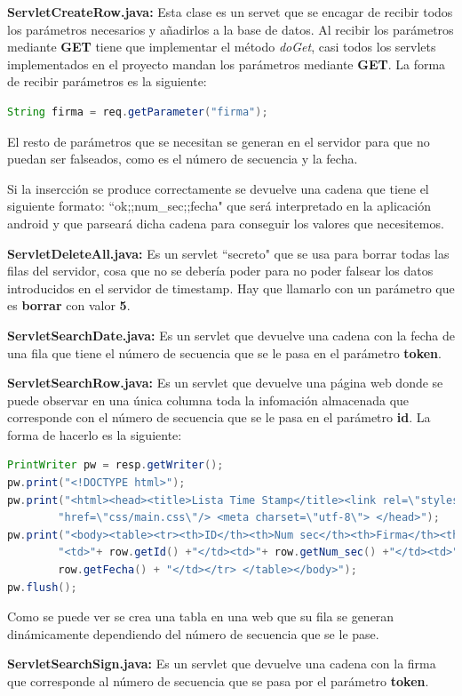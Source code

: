 \begin{description}
\item \textbf{ServletCreateRow.java:} Esta clase es un servet que se encagar de recibir todos los parámetros necesarios y añadirlos a la base de datos. Al recibir los parámetros mediante \textbf{GET} tiene que implementar el método \textit{doGet}, casi todos los servlets implementados en el proyecto mandan los parámetros mediante \textbf{GET}. La forma de recibir parámetros es la siguiente:

\begin{lstlisting}[language=Java]
String firma = req.getParameter("firma");
\end{lstlisting}

El resto de parámetros que se necesitan se generan en el servidor para que no puedan ser falseados, como es el número de secuencia y la fecha.

Si la insercción se produce correctamente se devuelve una cadena que tiene el siguiente formato: ``ok;;num\_sec;;fecha" que será interpretado en la aplicación android y que parseará dicha cadena para conseguir los valores que necesitemos.

\item \textbf{ServletDeleteAll.java:} Es un servlet ``secreto" que se usa para borrar todas las filas del servidor, cosa que no se debería poder para no poder falsear los datos introducidos en el servidor de timestamp. Hay que llamarlo con un parámetro que es \textbf{borrar} con valor \textbf{5}.

\item \textbf{ServletSearchDate.java:} Es un servlet que devuelve una cadena con la fecha de una fila que tiene el número de secuencia que se le pasa en el parámetro \textbf{token}.

\item \textbf{ServletSearchRow.java:} Es un servlet que devuelve una página web donde se puede observar en una única columna toda la infomación almacenada que corresponde con el número de secuencia que se le pasa en el parámetro \textbf{id}. La forma de hacerlo es la siguiente:

\begin{lstlisting}[language=Java]
PrintWriter pw = resp.getWriter();
pw.print("<!DOCTYPE html>");
pw.print("<html><head><title>Lista Time Stamp</title><link rel=\"stylesheet\" type=\"text/css\" " +
		"href=\"css/main.css\"/> <meta charset=\"utf-8\"> </head>");
pw.print("<body><table><tr><th>ID</th><th>Num sec</th><th>Firma</th><th>Date</th></tr><tr> " +
		"<td>"+ row.getId() +"</td><td>"+ row.getNum_sec() +"</td><td>"+ row.getFirma() +"</td><td>" +
		row.getFecha() + "</td></tr> </table></body>");
pw.flush();
\end{lstlisting}

Como se puede ver se crea una tabla en una web que su fila se generan dinámicamente dependiendo del número de secuencia que se le pase.

\item \textbf{ServletSearchSign.java:} Es un servlet que devuelve una cadena con la firma que corresponde al número de secuencia que se pasa por el parámetro \textbf{token}.
\end{description}

